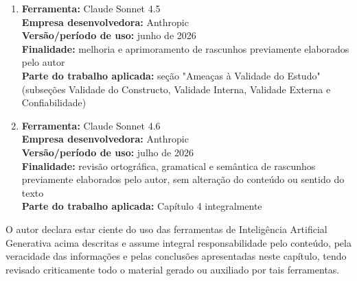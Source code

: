 \begin{enumerate}
    \item \textbf{Ferramenta:} Claude Sonnet 4.5 \\
    \textbf{Empresa desenvolvedora:} Anthropic \\
    \textbf{Versão/período de uso:} junho de 2026 \\
    \textbf{Finalidade:} melhoria e aprimoramento de rascunhos previamente elaborados pelo autor \\
    \textbf{Parte do trabalho aplicada:} seção "Ameaças à Validade do Estudo" (subseções Validade do Constructo, Validade Interna, Validade Externa e Confiabilidade)

    \item \textbf{Ferramenta:} Claude Sonnet 4.6 \\
    \textbf{Empresa desenvolvedora:} Anthropic \\
    \textbf{Versão/período de uso:} julho de 2026 \\
    \textbf{Finalidade:} revisão ortográfica, gramatical e semântica de rascunhos previamente elaborados pelo autor, sem alteração do conteúdo ou sentido do texto \\
    \textbf{Parte do trabalho aplicada:} Capítulo 4 integralmente
\end{enumerate}

O autor declara estar ciente do uso das ferramentas de Inteligência Artificial Generativa acima descritas e assume integral responsabilidade pelo conteúdo, pela veracidade das informações e pelas conclusões apresentadas neste capítulo, tendo revisado criticamente todo o material gerado ou auxiliado por tais ferramentas.